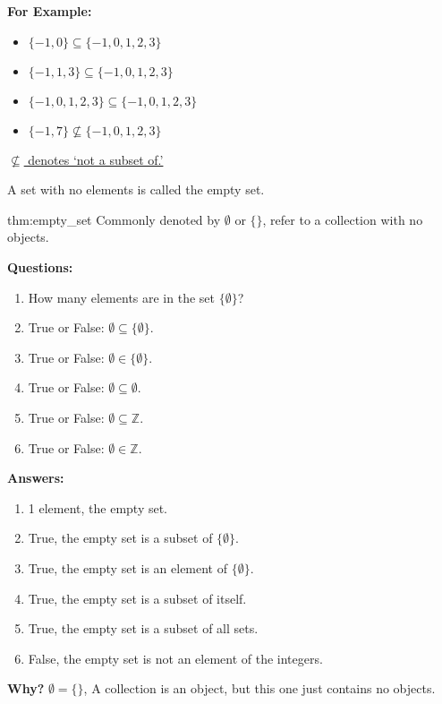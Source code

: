 \noindent
\textbf{For Example:}
\begin{itemize}
    \item $\{-1, 0\} \subseteq \{-1, 0, 1, 2, 3\}$
    \item $\{-1, 1, 3\} \subseteq \{-1, 0, 1, 2, 3\}$
    \item $\{-1, 0, 1, 2, 3\} \subseteq \{-1, 0, 1, 2, 3\}$
    \item $\{-1, 7\} \not\subseteq \{-1, 0, 1, 2, 3\}$
\end{itemize}

\underline{$\not\subseteq$ denotes `not a subset of.'}

\vspace{1em}
\noindent
A set with no elements is called the empty set.
\begin{theo}{thm:empty_set}
    Commonly denoted by $\emptyset$ or $\{\}$, refer to a collection with no objects.
\end{theo}

\noindent
\textbf{Questions:}
\begin{enumerate}
    \item How many elements are in the set  $\{\emptyset\}$?
    \item True or False: $\emptyset \subseteq \{\emptyset\}$.
    \item True or False: $\emptyset \in \{\emptyset\}$.
    \item True or False: $\emptyset \subseteq \emptyset$.
    \item True or False: $\emptyset \subseteq \mathbb{Z}$.
    \item True or False: $\emptyset \in \mathbb{Z}$.
\end{enumerate}

\noindent
\textbf{Answers:}
\begin{enumerate}
    \item 1 element, the empty set.
    \item True, the empty set is a subset of $\{\emptyset\}$.
    \item True, the empty set is an element of $\{\emptyset\}$.
    \item True, the empty set is a subset of itself.
    \item True, the empty set is a subset of all sets.
    \item False, the empty set is not an element of the integers.
\end{enumerate}

\noindent
\textbf{Why?} $\emptyset=\{\}$, A collection is an object, but this one just contains no objects.\\

